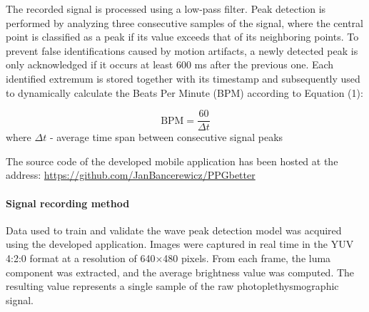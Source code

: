 \documentclass[journal]{IEEEtran}
\begin{document}
The recorded signal is processed using a low-pass filter. Peak detection is performed by analyzing three consecutive samples of the signal, where the central point is classified as a peak if its value exceeds that of its neighboring points. To prevent false identifications caused by motion artifacts, a newly detected peak is only acknowledged if it occurs at least 600 ms after the previous one. Each identified extremum is stored together with its timestamp and subsequently used to dynamically calculate the Beats Per Minute (BPM) according to Equation (1):

\begin{equation}
\text{BPM} = \frac{60}{\Delta t}
\label{eq:bpm}
\end{equation}
where $\Delta t$  - average time span between consecutive signal peaks

The source code of the developed mobile application has been hosted at the address:
\href{https://github.com/JanBancerewicz/PPGbetter}{https://github.com/JanBancerewicz/PPGbetter}

\newpage
\paragraph{Signal recording method}
Data used to train and validate the wave peak detection model was acquired using the developed application. Images were captured in real time in the YUV 4:2:0 format at a resolution of 640×480 pixels. From each frame, the luma component was extracted, and the average brightness value was computed. The resulting value represents a single sample of the raw photoplethysmographic signal.
\end{document}

